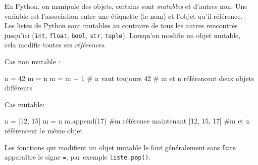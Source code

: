 \documentclass[11pt,a4paper]{article}
\begin{document}
\begin{tcolorbox}[left=0cm,title=\bf{\faPython \; Mutables et non mutables},colbacktitle=cfond]
    En Python, on manipule des objets, certains sont \textit{mutables} et d'autres non. Une variable est l'association entre une étiquette (le nom) et l'objet qu'il référence. Les listes de Python sont mutables au contraire de tous les autres rencontrés jusqu'ici ({\tt int}, {\tt float}, {\tt bool}, {\tt str}, {\tt tuple}). Lorsqu'on modifie un objet mutable, cela modifie toutes ses \textit{références}.
        
    \setlength{\multicolsep}{0pt}
    \begin{multicols}{2}
        Cas non mutable :
        \begin{python}
n = 42
m = n
m = m + 1
# n vaut toujours 42
# m et n référencent deux objets différents
\end{python}
        Cas mutable: 
        \begin{python} 
n = [12, 15]
m = n
m.append(17)
#m référence maintenant [12, 15, 17]
#m et n référencent le même objet
        \end{python}
    \end{multicols}
    Les fonctions qui modifient un objet mutable le font généralement sans faire apparaître le signe {\tt =}, par exemple \texttt{liste.pop()}.
\end{tcolorbox}
\end{document}
